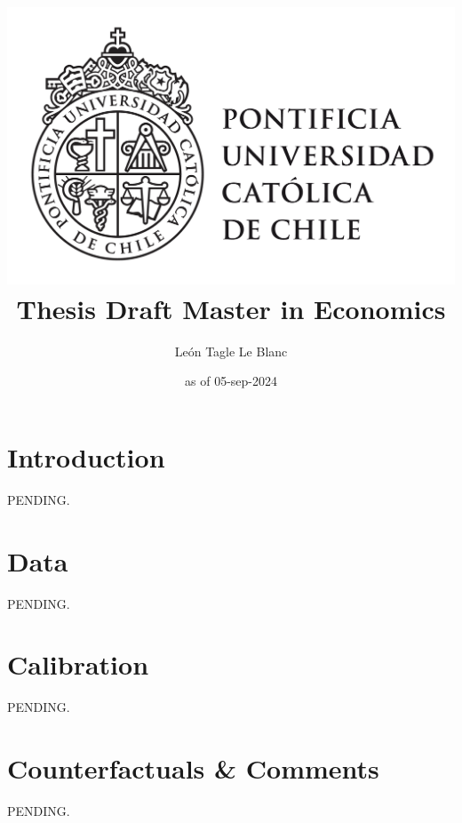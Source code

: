 \documentclass{article}
\title{\includegraphics[scale=0.3]{UC_lineal_TR-01.png} \linebreak \linebreak 
Thesis Draft \linebreak Master in Economics}
\author{León Tagle Le Blanc}
\date{as of 05-sep-2024}
\begin{document}
\begin{titlepage}
\maketitle
\tableofcontents
\setcounter{page}{0}
\thispagestyle{empty}
\end{titlepage}

\section{Introduction}

PENDING.



\section{Data}

PENDING.



\section{Calibration}

PENDING.

\section{Counterfactuals \& Comments}

PENDING.

\newpage

	 


\newpage


\end{document}

